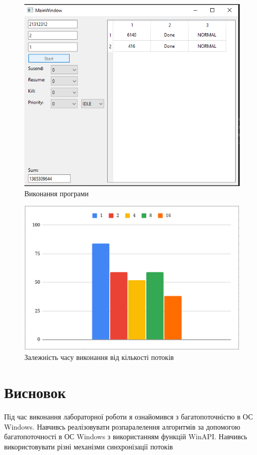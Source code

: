 \documentclass{article}
\begin{document}
\begin{normalsize}
	\begin{figure}[H]
		\centering
		\includegraphics[scale=0.6]{v}
		\caption{Виконання програми}
	\end{figure}

	\begin{figure}[H]
		\centering
		\includegraphics[scale=0.7]{1}
		\caption{Залежність часу виконання від кількості потоків}
	\end{figure}
	
	\section*{Висновок}
	Під час виконання лабораторної роботи я ознайомився з багатопоточністю в ОС Windows. Навчивсь
	реалізовувати розпаралелення алгоритмів за допомогою багатопоточності в ОС
	Windows з використанням функцій WinAPI. Навчивсь використовувати різні
	механізми синхронізації потоків
	
	 
\end{normalsize}
\end{document}
